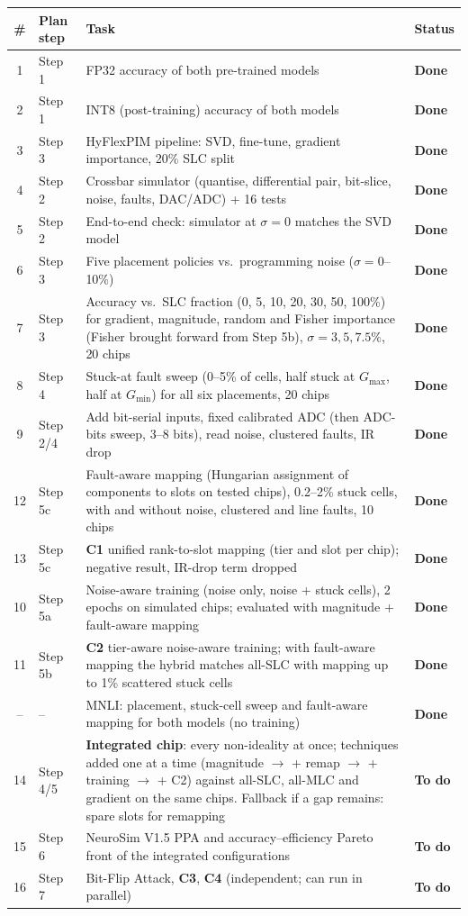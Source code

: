 \documentclass[10pt,a4paper]{article}
\newcommand{\done}{\textcolor{done}{\textbf{Done}}}
\newcommand{\todo}{\textcolor{todo}{\textbf{To do}}}
\begin{document}
\begin{table}[h]
\centering\small
\begin{tabularx}{\linewidth}{@{}c l X l@{}}
\toprule
\# & Plan step & Task & Status \\
\midrule
1 & Step 1 & FP32 accuracy of both pre-trained models & \done \\
2 & Step 1 & INT8 (post-training) accuracy of both models & \done \\
3 & Step 3 & HyFlexPIM pipeline: SVD, fine-tune, gradient importance, 20\% SLC split & \done \\
4 & Step 2 & Crossbar simulator (quantise, differential pair, bit-slice, noise, faults, DAC/ADC) + 16 tests & \done \\
5 & Step 2 & End-to-end check: simulator at $\sigma=0$ matches the SVD model & \done \\
6 & Step 3 & Five placement policies vs.\ programming noise ($\sigma=0$--10\%) & \done \\
7 & Step 3 & Accuracy vs.\ SLC fraction (0, 5, 10, 20, 30, 50, 100\%) for gradient, magnitude, random and Fisher importance (Fisher brought forward from Step 5b), $\sigma=3,5,7.5\%$, 20 chips & \done \\
8 & Step 4 & Stuck-at fault sweep (0--5\% of cells, half stuck at $G_{\max}$, half at $G_{\min}$) for all six placements, 20 chips & \done \\
9 & Step 2/4 & Add bit-serial inputs, fixed calibrated ADC (then ADC-bits sweep, 3--8 bits), read noise, clustered faults, IR drop & \done \\
12 & Step 5c & Fault-aware mapping (Hungarian assignment of components to slots on tested chips), 0.2--2\% stuck cells, with and without noise, clustered and line faults, 10 chips & \done \\
13 & Step 5c & \textbf{C1} unified rank-to-slot mapping (tier and slot per chip); negative result, IR-drop term dropped & \done \\
10 & Step 5a & Noise-aware training (noise only, noise + stuck cells), 2 epochs on simulated chips; evaluated with magnitude + fault-aware mapping & \done \\
11 & Step 5b & \textbf{C2} tier-aware noise-aware training; with fault-aware mapping the hybrid matches all-SLC with mapping up to 1\% scattered stuck cells & \done \\
-- & -- & MNLI: placement, stuck-cell sweep and fault-aware mapping for both models (no training) & \done \\
14 & Step 4/5 & \textbf{Integrated chip}: every non-ideality at once; techniques added one at a time (magnitude $\to$ + remap $\to$ + training $\to$ + C2) against all-SLC, all-MLC and gradient on the same chips. Fallback if a gap remains: spare slots for remapping & \todo \\
15 & Step 6 & NeuroSim V1.5 PPA and accuracy--efficiency Pareto front of the integrated configurations & \todo \\
16 & Step 7 & Bit-Flip Attack, \textbf{C3}, \textbf{C4} (independent; can run in parallel) & \todo \\
\bottomrule
\end{tabularx}
\end{table}
\end{document}
